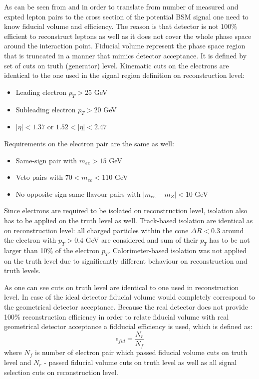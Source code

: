 As can be seen from  and  in order to translate from number of measured and expted lepton pairs 
to the cross section of the potential BSM signal one need to know fiducial volume and efficiency.
The reason is that detector is not 100$\%$ efficient to reconstruct leptons as well as it does not cover the whole phase space around the interaction point.
Fiducial volume represent the phase space region that is truncated in a manner that mimics detector acceptance.
It is defined by set of cuts on truth (generator) level. 
Kinematic cuts on the electrons are identical to the one used in the signal region definition on reconstruction level:
\begin{itemize}
 \item Leading electron $p_T > 25$ GeV
 \item Subleading electron $p_T > 20$ GeV
 \item $|\eta|<1.37$ or $1.52<|\eta|<2.47$
\end{itemize}
Requirements on the electron pair are the same as well:
\begin{itemize}
 \item Same-sign pair with $m_{ee} > 15$ GeV
 \item Veto pairs with $70 < m_{ee} < 110$ GeV
 \item No opposite-sign same-flavour pairs with $|m_{ee} - m_{Z}| < 10$ GeV
\end{itemize}
Since electrons are required to be isolated on reconstruction level, isolation also has to be applied on the truth level as well.
Track-based isolation are identical as on reconstruction level:
all charged particles within the cone $\Delta R < 0.3$ around the electron with $p_T > 0.4$ GeV are considered and
sum of their $p_T$ has to be not larger than 10$\%$ of the electron $p_T$.
Calorimeter-based isolation was not applied on the truth level due to significantly different behaviour on reconstruction and truth levels.

As one can see cuts on truth level are identical to one used in reconstruction level.
In case of the ideal detector fiducial volume would completely correspond to the geometrical detector acceptance.
Because the real detector does not provide 100$\%$ reconstruction efficiency in order to relate fiducial volume with real geometrical detector acceptance
a fidducial efficiency is used, which is defined as:
\begin{equation}
 \epsilon_{fid} = \dfrac{N_r}{N_f}
\end{equation}
where $N_f$ is number of electron pair which passed fiducial volume cuts on truth level and $N_r$ - passed fiducial volume cuts on truth level 
as well as all signal selection cuts on reconstruction level.

